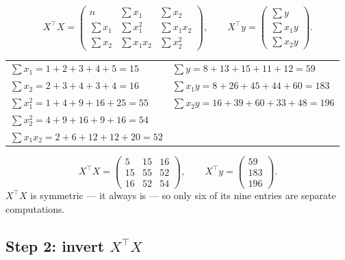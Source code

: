\documentclass[11pt]{article}
\newcommand{\Xt}{X^{\!\top}}
\begin{document}
\begin{worked}
\[
  \Xt X =
  \begin{pmatrix}
    n & \sum x_1 & \sum x_2\\
    \sum x_1 & \sum x_1^2 & \sum x_1x_2\\
    \sum x_2 & \sum x_1x_2 & \sum x_2^2
  \end{pmatrix},
  \qquad
  \Xt y = \begin{pmatrix} \sum y\\ \sum x_1y\\ \sum x_2y\end{pmatrix}.
\]
\begin{center}
\begin{tabular}{@{}ll@{}}
\toprule
$\sum x_1 = 1+2+3+4+5 = 15$ & $\sum y = 8+13+15+11+12 = 59$\\
$\sum x_2 = 2+3+4+3+4 = 16$ & $\sum x_1 y = 8+26+45+44+60 = 183$\\
$\sum x_1^2 = 1+4+9+16+25 = 55$ & $\sum x_2 y = 16+39+60+33+48 = 196$\\
$\sum x_2^2 = 4+9+16+9+16 = 54$ & \\
$\sum x_1x_2 = 2+6+12+12+20 = 52$ & \\
\bottomrule
\end{tabular}
\end{center}
\[
  \Xt X = \begin{pmatrix} 5 & 15 & 16\\ 15 & 55 & 52\\ 16 & 52 & 54
          \end{pmatrix},
  \qquad
  \Xt y = \begin{pmatrix} 59\\ 183\\ 196\end{pmatrix}.
\]
$\Xt X$ is symmetric --- it always is --- so only six of its nine entries are
separate computations.
\end{worked}

\subsection{\texorpdfstring{Step 2: invert $\Xt X$}{Step 2: invert X\textquotesingle X}}
\end{document}
